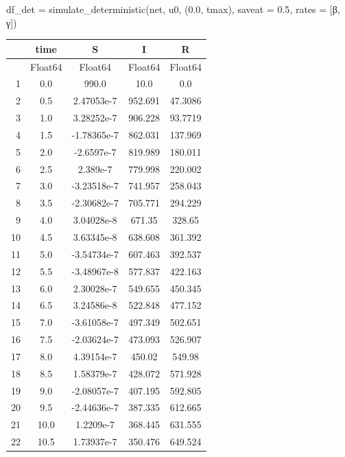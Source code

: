 \documentclass[
  12pt,
  a4paper,
  DIV=11,
  numbers=noendperiod]{scrreprt}
\newenvironment{Shaded}{\begin{snugshade}}{\end{snugshade}}
\newcommand{\FloatTok}[1]{\textcolor[rgb]{0.68,0.00,0.00}{#1}}
\newcommand{\FunctionTok}[1]{\textcolor[rgb]{0.28,0.35,0.67}{#1}}
\newcommand{\NormalTok}[1]{\textcolor[rgb]{0.00,0.23,0.31}{#1}}
\newcommand{\OperatorTok}[1]{\textcolor[rgb]{0.37,0.37,0.37}{#1}}
\begin{document}
\begin{Shaded}
\begin{Highlighting}[]
\NormalTok{df\_det }\OperatorTok{=} \FunctionTok{simulate\_deterministic}\NormalTok{(net, u0, (}\FloatTok{0.0}\NormalTok{, tmax), saveat }\OperatorTok{=} \FloatTok{0.5}\NormalTok{, rates }\OperatorTok{=}\NormalTok{ [β, γ])}
\end{Highlighting}
\end{Shaded}

\begin{tabular}{r|cccc}
    & time & S & I & R\\
    \hline
    & Float64 & Float64 & Float64 & Float64\\
    \hline
    1 & 0.0 & 990.0 & 10.0 & 0.0 \\
    2 & 0.5 & 2.47053e-7 & 952.691 & 47.3086 \\
    3 & 1.0 & 3.28252e-7 & 906.228 & 93.7719 \\
    4 & 1.5 & -1.78365e-7 & 862.031 & 137.969 \\
    5 & 2.0 & -2.6597e-7 & 819.989 & 180.011 \\
    6 & 2.5 & 2.389e-7 & 779.998 & 220.002 \\
    7 & 3.0 & -3.23518e-7 & 741.957 & 258.043 \\
    8 & 3.5 & -2.30682e-7 & 705.771 & 294.229 \\
    9 & 4.0 & 3.04028e-8 & 671.35 & 328.65 \\
    10 & 4.5 & 3.63345e-8 & 638.608 & 361.392 \\
    11 & 5.0 & -3.54734e-7 & 607.463 & 392.537 \\
    12 & 5.5 & -3.48967e-8 & 577.837 & 422.163 \\
    13 & 6.0 & 2.30028e-7 & 549.655 & 450.345 \\
    14 & 6.5 & 3.24586e-8 & 522.848 & 477.152 \\
    15 & 7.0 & -3.61058e-7 & 497.349 & 502.651 \\
    16 & 7.5 & -2.03624e-7 & 473.093 & 526.907 \\
    17 & 8.0 & 4.39154e-7 & 450.02 & 549.98 \\
    18 & 8.5 & 1.58379e-7 & 428.072 & 571.928 \\
    19 & 9.0 & -2.08057e-7 & 407.195 & 592.805 \\
    20 & 9.5 & -2.44636e-7 & 387.335 & 612.665 \\
    21 & 10.0 & 1.2209e-7 & 368.445 & 631.555 \\
    22 & 10.5 & 1.73937e-7 & 350.476 & 649.524 \\

\end{tabular}
\end{document}
